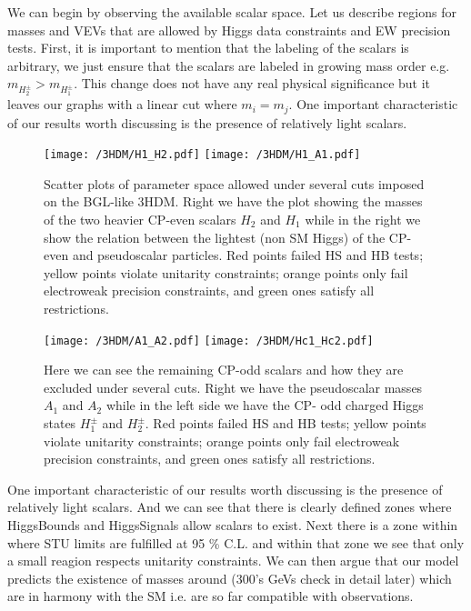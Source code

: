 We can begin by observing the available scalar space. 
%
Let us describe regions for masses and VEVs that are allowed by Higgs data constraints and EW precision tests. 
%
First, it is important to mention that the labeling of the scalars is arbitrary, we just ensure that the scalars are labeled in growing mass order e.g. $m_{H^\pm_2} > m_{H^\pm_1}$. 
%
This change does not have any real physical significance but it leaves our graphs with a linear cut where $m_i = m_j$. 
%
One important characteristic of our results worth discussing is the presence of relatively light  scalars.
%
\begin{figure}[H]
	\centering
	\texttt{[image: /3HDM/H1\_H2.pdf]}
	\texttt{[image: /3HDM/H1\_A1.pdf]}
	\caption{Scatter plots of parameter space allowed under  several cuts imposed on the BGL-like 3HDM. Right we have the plot showing the masses of the two heavier CP-even scalars $H_2$ and $H_1$ while in the right we show the relation between the lightest (non SM Higgs) of the CP-even and pseudoscalar particles. Red points failed HS and HB tests; yellow points violate unitarity constraints; orange points only fail electroweak precision constraints, and green ones satisfy all restrictions.}
	\label{fig:H1_A1_Plots}
\end{figure}	

\begin{figure}[H]
	\centering
	\texttt{[image: /3HDM/A1\_A2.pdf]}
	\texttt{[image: /3HDM/Hc1\_Hc2.pdf]}
	\caption{}
	\label{fig:Other_H_plots}
	\caption{Here we can see the remaining CP-odd scalars and how they are excluded under several cuts. Right we have the pseudoscalar masses $A_1$ and $A_2$ while in the left side we have the CP- odd charged Higgs states $H_1^\pm$ and $H_2^\pm$. Red points failed HS and HB tests; yellow points violate unitarity constraints; orange points only fail electroweak precision constraints, and green ones satisfy all restrictions.}
\end{figure}	

One important characteristic of our results worth discussing is the presence of relatively light  scalars. 
%
And we can see that there is clearly defined zones where HiggsBounds and HiggsSignals allow scalars to exist. 
%
Next there is a zone within where STU limits are fulfilled at 95 \% C.L. and within that zone we see that only a small reagion respects unitarity constraints. 
%
We can then argue that our model predicts the existence of masses around (300's GeVs check in detail later) which are in harmony with the SM i.e. are so far compatible with observations. 


